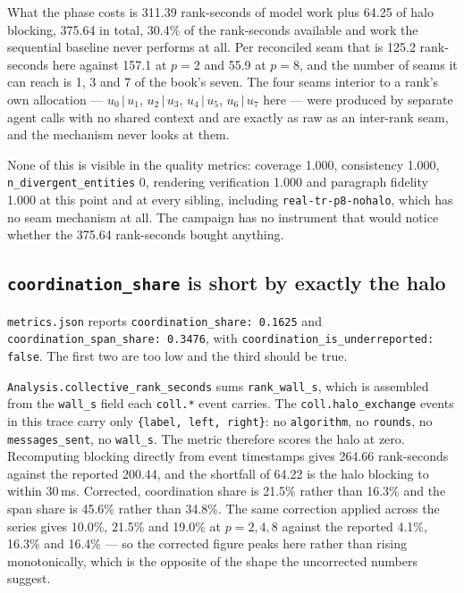 \documentclass[11pt]{article}
\begin{document}
What the phase costs is 311.39 rank-seconds of model work plus 64.25 of halo blocking, 375.64 in
total, 30.4\% of the rank-seconds available and work the sequential baseline never performs at
all. Per reconciled seam that is 125.2 rank-seconds here against 157.1 at $p=2$ and 55.9 at
$p=8$, and the number of seams it can reach is 1, 3 and 7 of the book's seven. The four seams
interior to a rank's own allocation --- $u_0\,|\,u_1$, $u_2\,|\,u_3$, $u_4\,|\,u_5$,
$u_6\,|\,u_7$ here --- were produced by separate agent calls with no shared context and are
exactly as raw as an inter-rank seam, and the mechanism never looks at them.

None of this is visible in the quality metrics: coverage 1.000, consistency 1.000,
\texttt{n\_divergent\_entities} 0, rendering verification 1.000 and paragraph fidelity 1.000 at
this point and at every sibling, including \texttt{real-tr-p8-nohalo}, which has no seam
mechanism at all. The campaign has no instrument that would notice whether the 375.64
rank-seconds bought anything.

\subsection*{\texttt{coordination\_share} is short by exactly the halo}

\texttt{metrics.json} reports \texttt{coordination\_share: 0.1625} and
\texttt{coordination\_span\_share: 0.3476}, with \texttt{coordination\_is\_underreported: false}.
The first two are too low and the third should be true.

\texttt{Analysis.collective\_rank\_seconds} sums \texttt{rank\_wall\_s}, which is assembled from
the \texttt{wall\_s} field each \texttt{coll.*} event carries. The \texttt{coll.halo\_exchange}
events in this trace carry only \texttt{\{label, left, right\}}: no \texttt{algorithm}, no
\texttt{rounds}, no \texttt{messages\_sent}, no \texttt{wall\_s}. The metric therefore scores the
halo at zero. Recomputing blocking directly from event timestamps gives 264.66 rank-seconds
against the reported 200.44, and the shortfall of 64.22 is the halo blocking to within 30\,ms.
Corrected, coordination share is 21.5\% rather than 16.3\% and the span share is 45.6\% rather
than 34.8\%. The same correction applied across the series gives 10.0\%, 21.5\% and 19.0\% at
$p=2,4,8$ against the reported 4.1\%, 16.3\% and 16.4\% --- so the corrected figure peaks here
rather than rising monotonically, which is the opposite of the shape the uncorrected numbers
suggest.
\end{document}
